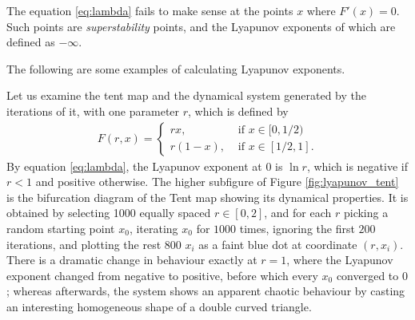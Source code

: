 The equation \eqref{eq:lambda} fails to make sense at the points $x$ where $F'(x) = 0$.
Such points are \emph{superstability} points, and the Lyapunov exponents of which are defined as $- \infty$.

The following are some examples of calculating Lyapunov exponents.

\begin{exmp}
	Let us examine the tent map and the dynamical system generated by the iterations of it, with one parameter $r$, which is defined by
    \begin{align}
        F(r, x)= 
        \begin{cases}
            r x, & \text{ if } x \in [0,1/2) \\
            r (1-x), & \text{ if } x \in [1/2,1].
        \end{cases} \label{eq:tent}
    \end{align}
	By equation \eqref{eq:lambda}, the Lyapunov exponent at $0$ is $\ln r$, which is negative if $r < 1$ and positive otherwise.
	The higher subfigure of Figure \ref{fig:lyapunov_tent} is the bifurcation diagram of the Tent map showing its dynamical properties. 
	It is obtained by selecting 1000 equally spaced $r \in [0,2]$, and for each $r$ picking a random starting point $x_0$, iterating $x_0$ for $1000$ times, ignoring the first $200$ iterations, and plotting the rest $800$ $ x_i$ as a faint blue dot at coordinate $(r, x_i)$. 
	There is a dramatic change in behaviour exactly at $r=1$, where the Lyapunov exponent changed from negative to positive, before which every $x_0$ converged to $0$; whereas afterwards, the system shows an apparent chaotic behaviour by casting an interesting homogeneous shape of a double curved triangle.


\end{exmp}
